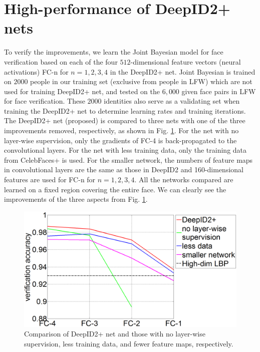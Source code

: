 \documentclass[10pt,twocolumn,letterpaper]{article}
\begin{document}
\section{High-performance of DeepID2+ nets}
\label{sec:performance}

To verify the improvements, we learn the Joint Bayesian model \cite{chen2012} for face verification based on each of the four $512$-dimensional feature vectors (neural activations) FC-n for $n=1,2,3,4$ in the DeepID2+ net. Joint Bayesian is trained on $2000$ people in our training set (exclusive from people in LFW) which are not used for training DeepID2+ net, and tested on the $6,000$ given face pairs in LFW for face verification. These $2000$ identities also serve as a validating set when training the DeepID2+ net to determine learning rates and training iterations. The DeepID2+ net (proposed) is compared to three nets with one of the three improvements removed, respectively, as shown in Fig. \ref{fig:self_comparison}. For the net with no layer-wise supervision, only the gradients of FC-4 is back-propagated to the convolutional layers. For the net with less training data, only the training data from CelebFaces+ is used. For the smaller network, the numbers of feature maps in  convolutional layers are the same as those in DeepID2 and 160-dimensional features are used for FC-n for $n=1,2,3,4$. All the networks compared are learned on a fixed region covering the entire face. We can clearly see the improvements of the three aspects from Fig. \ref{fig:self_comparison}.

\begin{figure}[t]
\begin{center}
\includegraphics[width=1.0\linewidth]{picture/10.png}
\end{center}
\vspace{-0.15in}
\caption{Comparison of DeepID2+ net and those with no layer-wise supervision, less training data, and fewer feature maps, respectively.}
\label{fig:self_comparison}
\vspace{-0.1in}
\end{figure}
\end{document}

